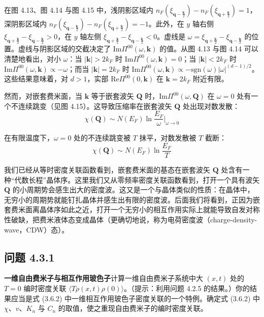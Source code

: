 在图 4.13、图 4.14 与图 4.15 中，浅阴影区域内 $n_F(\xi_{\pmb{q}-\frac{\pmb{k}}{2}})-n_F(\xi_{\pmb{q}+\frac{\pmb{k}}{2}})=1$，深阴影区域内 $n_F(\xi_{\pmb{q}-\frac{\pmb{k}}{2}})-n_F(\xi_{\pmb{q}+\frac{\pmb{k}}{2}})=-1$。此外，在 $y$ 轴右侧 $\xi_{\pmb{q}+\frac{\pmb{k}}{2}}-\xi_{\pmb{q}-\frac{\pmb{k}}{2}}>0$，在 $y$ 轴左侧 $\xi_{\pmb{q}+\frac{\pmb{k}}{2}}-\xi_{\pmb{q}-\frac{\pmb{k}}{2}}<0$。虚线是 $\omega=\xi_{\pmb{q}+\frac{\pmb{k}}{2}}-\xi_{\pmb{q}-\frac{\pmb{k}}{2}}$ 的位置。虚线与阴影区域的交截决定了 $\mathrm{Im}\Pi^{00}(\omega,\pmb{k})$ 的值。从图 4.13 与图 4.14 可以清楚地看出，对小 $\omega$：当 $|\pmb{k}|>2k_F$ 时 $\mathrm{Im}\Pi^{00}(\omega,\pmb{k})=0$；当 $|\pmb{k}|<2k_F$ 时 $\mathrm{Im}\Pi^{00}(\omega,\pmb{k})\propto-\omega$；而当 $|\pmb{k}|=2k_F$ 时 $\mathrm{Im}\Pi^{00}(\omega,\pmb{k})\propto-\mathrm{sgn}(\omega)|\omega|^{(d-1)/2}$。这些结果意味着，对 $d>1$，实部 $\mathrm{Re}\Pi^{00}(0,\pmb{k})$ 在 $\pmb{k}=2k_F$ 附近有限。

然而，对嵌套费米面，当 $\pmb{k}$ 等于嵌套波矢 $\pmb{Q}$ 时，$\mathrm{Im}\Pi^{00}(\omega,\pmb{Q})$ 在 $\omega=0$ 处有一个不连续跳变（见图 4.15）。这导致压缩率在嵌套波矢 $\pmb{Q}$ 处出现对数发散：
\begin{equation*}
\chi(\pmb{Q}) \sim N(E_F)\ln\frac{E_F}{\omega}\Big|_{\omega\to 0}
\end{equation*}

在有限温度下，$\omega=0$ 处的不连续跳变被 $T$ 抹平，对数发散被 $T$ 截断：
\begin{equation*}
\chi(\pmb{Q}) \sim N(E_F)\ln\frac{E_F}{T} \tag{4.3.3}
\end{equation*}

我们已经从等时密度关联函数看到，嵌套费米面的基态在嵌套波矢 $\pmb{Q}$ 处含有一种“代数长程”晶体序。这里我们又从零频率密度关联函数看到，打开一个具有波矢 $\pmb{Q}$ 的小周期势会感生出大的密度波。这又是一个与晶体类似的性质：在晶体中，无穷小的周期势就能钉扎晶体并感生出有限的密度波。后面我们将看到，正因为嵌套费米面离晶体序如此之近，打开一个无穷小的相互作用实际上就能导致自发对称性破缺，把费米液体态变成晶体（更确切地说，称为电荷密度波（charge-density-wave，CDW）态）。

\subsection*{问题 4.3.1}

\textbf{一维自由费米子与相互作用玻色子}\quad 计算一维自由费米子系统中大 $(x,t)$ 处的 $T=0$ 编时密度关联 $\langle T\rho(x,t)\rho(0)\rangle$。（提示：利用问题 4.2.5 的结果。）你的结果应当是式 (3.6.2) 中一维相互作用玻色子密度关联的一个特例。确定式 (3.6.2) 中 $\chi$、$v$、$K_n$ 与 $C_n$ 的取值，使之重现自由费米子的编时密度关联。

